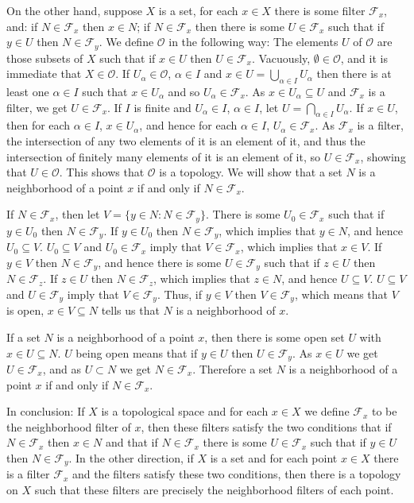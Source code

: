 \documentclass{article}
\begin{document}
On the other hand, suppose $X$ is a set,   for each $x \in X$ there is some filter $\mathcal{F}_x$, and: if $N \in \mathcal{F}_x$ then $x \in N$; if $N \in \mathcal{F}_x$ then there is some
$U \in \mathcal{F}_x$ such that if $y \in U$ then $N \in \mathcal{F}_y$. We define $\mathcal{O}$ in the following way: The elements $U$ of $\mathcal{O}$ are those subsets
of $X$ such that if $x \in U$ then $U \in \mathcal{F}_x$. Vacuously, $\emptyset \in \mathcal{O}$, and it is immediate that $X \in \mathcal{O}$. If $U_\alpha \in \mathcal{O}$,
$\alpha \in I$ and $x \in U=\bigcup_{\alpha \in I} U_\alpha$ then there is at least one $\alpha \in I$ such that $x \in U_\alpha$ and so $U_\alpha \in \mathcal{F}_x$. As $x \in U_\alpha \subseteq U$ and  
$\mathcal{F}_x$ is a filter, we get $U \in \mathcal{F}_x$. If $I$ is finite and $U_\alpha \in I$, $\alpha \in I$, let $U=\bigcap_{\alpha \in I} U_\alpha$.
If $x \in U$, then for each $\alpha \in I$, $x \in U_\alpha$, and hence for each $\alpha \in I$, $U_\alpha \in \mathcal{F}_x$.
As $\mathcal{F}_x$ is a filter, the intersection of any two elements of it is an element of it, and thus the intersection of finitely many elements of it is an element of it, so $U \in
\mathcal{F}_x$, showing that $U \in \mathcal{O}$. This shows that $\mathcal{O}$ is a topology. We will show that a set $N$ is a neighborhood of a point $x$ if and only
if $N \in \mathcal{F}_x$.

If $N \in \mathcal{F}_x$, then let
$V=\{y \in N: N \in \mathcal{F}_y\}$. There is some $U_0 \in \mathcal{F}_x$ such that if $y \in U_0$ then $N \in \mathcal{F}_y$. If $y \in U_0$ then $N \in \mathcal{F}_y$, which implies
that $y \in N$, and hence $U_0 \subseteq V$. $U_0 \subseteq V$ and $U_0 \in \mathcal{F}_x$  imply that
 $V \in \mathcal{F}_x$, which implies that $x \in V$.
If $y \in V$ then $N \in \mathcal{F}_y$, and hence there is some $U \in \mathcal{F}_y$ such that if $z \in U$ then $N \in \mathcal{F}_z$. If $z \in U$ then $N \in \mathcal{F}_z$, which
implies that $z \in N$, and hence $U \subseteq V$. $U \subseteq V$ and $U \in \mathcal{F}_y$ imply that $V \in \mathcal{F}_y$. Thus, if $y \in V$ then $V \in \mathcal{F}_y$, which
means that $V$ is open, $x \in V \subseteq N$ tells us that $N$ is a neighborhood of $x$.

If a set $N$ is a neighborhood of a point $x$, then there is some open set $U$ with $x \in U \subseteq N$. $U$ being open means that if $y \in U$ then $U \in \mathcal{F}_y$. 
As $x \in U$ we get $U \in \mathcal{F}_x$, and as $U \subset N$ we get $N \in \mathcal{F}_x$. Therefore a set $N$ is a neighborhood of a point $x$ if and only if $N \in \mathcal{F}_x$.

In conclusion: If $X$ is a topological space and for each $x \in X$ we define $\mathcal{F}_x$ to be the neighborhood filter of $x$,
then these filters satisfy the two conditions that if $N \in \mathcal{F}_x$ then $x \in N$ and that if $N \in \mathcal{F}_x$ there is some $U \in \mathcal{F}_x$ such that
if $y \in U$ then $N \in \mathcal{F}_y$. In the other direction, if $X$ is a set and for each point $x \in X$ there is a filter $\mathcal{F}_x$ and the filters satisfy these two
conditions, then there is a  topology on $X$ such that these filters are precisely the neighborhood filters of each point.
\end{document}
